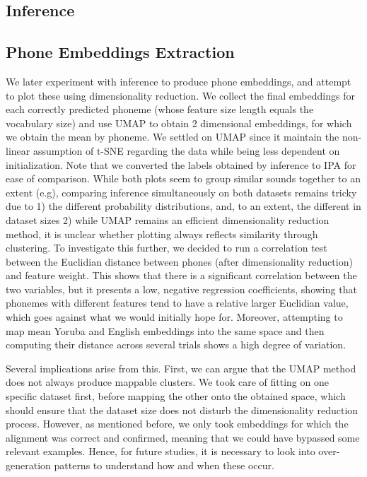 \documentclass[11pt]{article}
\begin{document}
{\subsection{Inference}

\subsection{Phone Embeddings Extraction}
We later experiment with inference to produce phone embeddings, and attempt to plot these using dimensionality reduction. We collect the final embeddings for each correctly predicted phoneme (whose feature size length equals the vocabulary size) and use UMAP to obtain 2 dimensional embeddings, for which we obtain the mean by phoneme. We settled on UMAP since it maintain the non-linear assumption of t-SNE regarding the data while being less dependent on initialization. Note that we converted the labels obtained by inference to IPA for ease of comparison. While both plots seem to group similar sounds together to an extent (e.g), comparing inference simultaneously on both datasets remains tricky due to 1) the different probability distributions, and, to an extent, the different in dataset sizes 2) while UMAP remains an efficient dimensionality reduction method, it is unclear whether plotting always reflects similarity through clustering.
To investigate this further, we decided to run a correlation test between the Euclidian distance between phones (after dimensionality reduction) and feature weight. This shows that there is a significant correlation between the two variables, but it presents a low, negative regression coefficients, showing that phonemes with different features tend to have a relative larger Euclidian value, which goes against what we would initially hope for. Moreover, attempting to map mean Yoruba and English embeddings into the same space and then computing their distance across several trials shows a high degree of variation.

Several implications arise from this. First, we can argue that the UMAP method does not always produce mappable clusters. We took care of fitting on one specific dataset first, before mapping the other onto the obtained space, which should ensure that the dataset size does not disturb the dimensionality reduction process.
However, as mentioned before, we only took embeddings for which the alignment was correct and confirmed, meaning that we could have bypassed some relevant examples. Hence, for future studies, it is necessary to look into over-generation patterns to understand how and when these occur.
}
\end{document}
